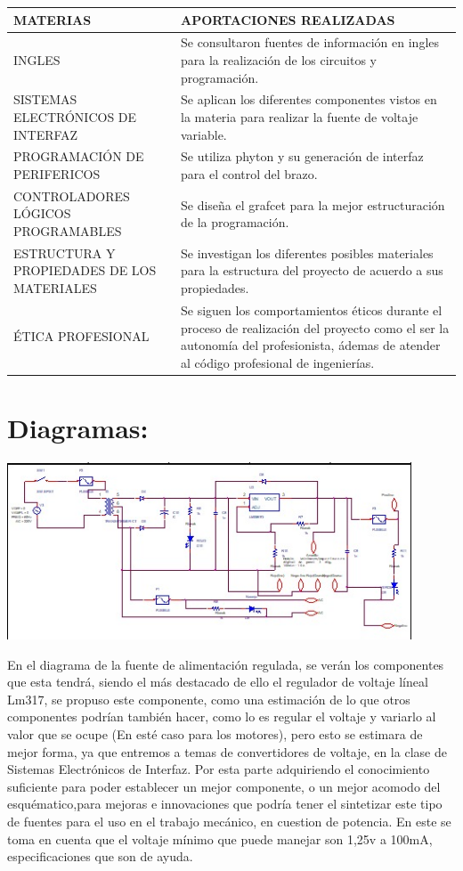\documentclass[14pt,a4paper]{article}
\begin{document}
\begin{tabular}{|p{70mm}|p{70mm}|} 

\hline
	MATERIAS & APORTACIONES REALIZADAS\\
\hline
	INGLES & Se consultaron fuentes de información en ingles para la realización de los circuitos y programación.\\
\hline
	SISTEMAS ELECTRÓNICOS DE INTERFAZ & Se aplican los diferentes componentes vistos en la materia para realizar la fuente de voltaje variable.\\
\hline
	PROGRAMACIÓN DE PERIFERICOS & Se utiliza phyton y su generación de interfaz para el control del brazo.\\
\hline
	CONTROLADORES LÓGICOS PROGRAMABLES & Se diseña el grafcet para la mejor estructuración de la programación.\\
\hline
	ESTRUCTURA Y PROPIEDADES DE LOS MATERIALES & Se investigan los diferentes posibles materiales para la estructura del proyecto de acuerdo a sus propiedades.  \\
\hline
	ÉTICA PROFESIONAL & Se siguen los comportamientos éticos durante el proceso de realización del proyecto como el ser la autonomía del profesionista, ádemas de atender al código profesional de ingenierías.  \\
\hline
\end{tabular}


\section{Diagramas:}

\begin{center}
\includegraphics[width=12cm]{Fuente.jpeg} 
\end{center}

En el diagrama de la fuente de alimentación regulada, se verán los componentes que esta tendrá, siendo el más destacado de ello el regulador de voltaje líneal Lm317, se propuso este componente, como una estimación de lo que otros componentes podrían también hacer, como lo es regular el voltaje y variarlo al valor que se ocupe (En esté caso para los motores), pero esto se estimara de mejor forma, ya que entremos a temas de convertidores de voltaje, en la clase de Sistemas Electrónicos de Interfaz. Por esta parte adquiriendo el conocimiento suficiente para poder establecer un mejor componente, o un mejor acomodo del esquématico,para mejoras e innovaciones que podría tener el sintetizar este tipo de fuentes para el uso en el trabajo mecánico, en cuestion de potencia. En este se toma en cuenta que el voltaje mínimo que puede manejar son 1,25v a 100mA, especificaciones que son de ayuda.\\
\end{document}
